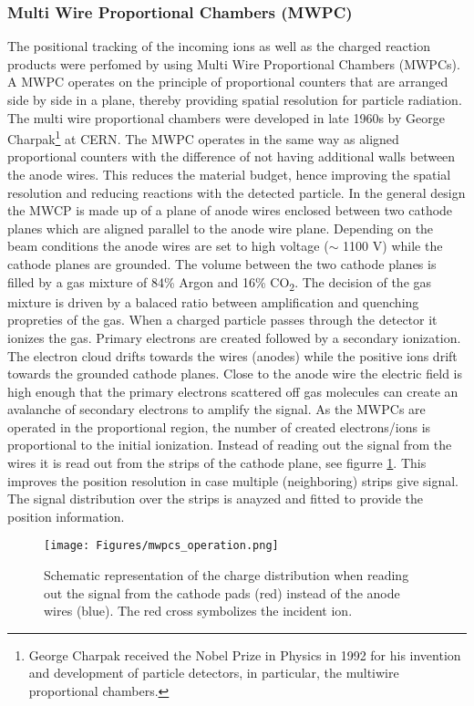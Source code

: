 \subsubsection{Multi Wire Proportional Chambers (MWPC)}\label{sec_mwpcs}
The positional tracking of the incoming ions as well as the charged reaction products were perfomed by using Multi Wire Proportional Chambers (MWPCs). A MWPC operates on the principle of proportional counters that are arranged side by side in a plane, thereby providing spatial resolution for particle radiation. The multi wire proportional chambers were developed in late 1960s by George Charpak\footnote{George Charpak received the Nobel Prize in Physics in 1992 for his invention and development of particle detectors, in particular, the multiwire proportional chambers.} at CERN\cite{charpak1968use}.\newline
The MWPC operates in the same way as aligned proportional counters with the difference of not having additional walls between the anode wires. This reduces the material budget, hence improving the spatial resolution and reducing reactions with the detected particle.\newline
In the general design the  MWCP is made up of a plane of anode wires enclosed between two cathode planes which are aligned parallel to the anode wire plane. Depending on the beam conditions the anode wires are set to high voltage ($\sim$ 1100 V) while the cathode planes are grounded.\newline
The volume between the two cathode planes is filled by a gas mixture of 84\% Argon and 16\% CO\textsubscript{2}. The decision of the gas mixture is driven by a balaced ratio between amplification and quenching propreties of the gas.\newline
When a charged particle passes through the detector it ionizes the gas. Primary electrons are created followed by a secondary ionization. The electron cloud drifts towards the wires (anodes) while the positive ions drift towards the grounded cathode planes. Close to the anode wire the electric field is high enough that the primary electrons scattered off gas molecules can create an avalanche of secondary electrons to amplify the signal. As the MWPCs are operated in the proportional region, the number of created electrons/ions is proportional to the initial ionization. Instead of reading out the signal from the wires it is read out from the strips of the cathode plane, see figurre \ref{fig:mwpcs_operation}. This improves the position resolution in case multiple (neighboring) strips give signal. The signal distribution over the strips is anayzed and fitted to provide the position information.\newline
\begin{figure}[htpb]
    \centering
    \texttt{[image: Figures/mwpcs\_operation.png]}
    \caption{
    Schematic representation of the charge distribution when reading out the signal from the cathode pads (red) instead of the anode wires (blue). The red cross symbolizes the incident ion.
    } 
    \label{fig:mwpcs_operation}
\end{figure}

